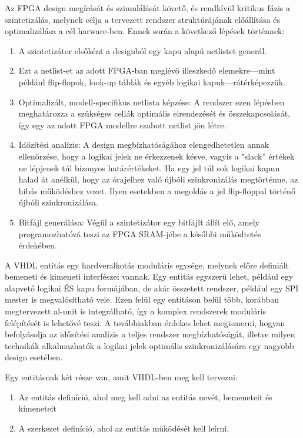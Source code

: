 \documentclass[a4paper,12pt,oneside]{book}
\begin{document}
Az FPGA design megírását és szimulálását követő, és rendkívül kritikus fázis a szintetizálás, melynek célja a tervezett rendszer struktúrájának előállítása és optimalizálása a cél harware-ben. Ennek során a következő lépések történnek:
\begin{enumerate} 
	\item A szintetizátor elsőként a designból egy kapu alapú netlistet generál. 
	\item Ezt a netlist-et az adott FPGA-ban meglévő illeszkedő elemekre—mint például flip-flopok, look-up táblák és egyéb logikai kapuk—rátérképezzük. 
	\item Optimalizált, modell-specifikus netlista képzése: A rendszer ezen lépésben meghatározza a szükséges cellák optimális elrendezését és összekapcsolását, így egy az adott FPGA modellre szabott netlist jön létre. 
	\item Időzítési analízis: A design megbízhatóságához elengedhetetlen annak ellenőrzése, hogy a logikai jelek ne érkezzenek késve, vagyis a "slack” értékek ne lépjenek túl bizonyos határértékeket. Ha egy jel túl sok logikai kapun halad át anélkül, hogy az órajelhez való újbóli szinkronizálás megtörténne, az hibás működéshez vezet. Ilyen esetekben a megoldás a jel flip-floppal történő újbóli szinkronizálása. 
	\item Bitfájl generálása: Végül a szintetizátor egy bitfájlt állít elő, amely programozhatóvá teszi az FPGA SRAM-jébe a későbbi működtetés érdekében. \end{enumerate}
A VHDL entitás egy hardveralkotás moduláris egysége, melynek előre definiált bemeneti és kimeneti interfészei vannak. Egy entitás egyszerű lehet, például egy alapvető logikai ÉS kapu formájában, de akár összetett rendszer, például egy SPI mester is megvalósítható vele. Ezen felül egy entitáson belül több, korábban megtervezett al-unit is integrálható, így a komplex rendszerek moduláris felépítését is lehetővé teszi.
A továbbiakban érdekes lehet megismerni, hogyan befolyásolja az időzítési analízis a teljes rendszer megbízhatóságát, illetve milyen technikák alkalmazhatók a logikai jelek optimális szinkronizálására egy nagyobb design esetében.


Egy entitásnak két része van, amit VHDL-ben meg kell tervezni: 
\begin{enumerate}
	\item Az entitás definíció, ahol meg kell adni az entitás nevét, bemeneteit és kimeneteit
	\item A szerkezet definíció, ahol az entitás működését kell leírni. 	  
\end{enumerate}
\end{document}
